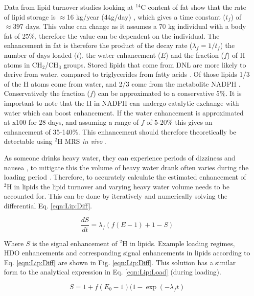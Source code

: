 Data from lipid turnover studies looking at $^{14}$C content of fat show that the rate of lipid storage is $\approx$16 kg/year (44g/day) \cite{Arner2011DynamicsDisease, Spalding2017ImpactTissue}, which gives a time constant ($t_f$) of $\approx$397 days. This value can change as it assumes a 70 kg individual with a body fat of 25\%, therefore the value can be dependent on the individual. The enhancement in fat is therefore the product of the decay rate ($\lambda_f = 1/t_f$) the number of days loaded ($t$), the water enhancement ($E$) and the fraction ($f$) of H atoms in CH$_2$/CH$_3$ groups. Stored lipids that come from \ac{DNL} are more likely to derive from water, compared to triglycerides from fatty acids \cite{Strawford2004AdiposeO}. Of those lipids 1/3 of the H atoms come from water, and 2/3 come from the metabolite NADPH \cite{Zhang2017ChemicalNADPH}. Conservatively the fraction ($f$) can be approximated to a conservative 5\%. It is important to note that the H in NADPH can undergo catalytic exchange with water which can boost enhancement. If the water enhancement is approximated at x100 for 28 days, and assuming a range of $f$ of 5-20\% this gives an enhancement of 35-140\%. This enhancement should therefore theoretically be detectable using $^2$H MRS \textit{in vivo} \cite{Brereton1986PreliminarySpectroscopy}. 

As someone drinks heavy water, they can experience periods of dizziness and nausea \cite{Money1974HeavyAlcohol}, to mitigate this the volume of heavy water drank often varies during the loading period \cite{Strawford2004AdiposeO, Cocking2023DeuteriumDosing}. Therefore, to accurately calculate the estimated enhancement of $^2$H in lipids the lipid turnover and varying heavy water volume needs to be accounted for. This can be done by iteratively and numerically solving the differential Eq. \ref{eqn:Lip:Diff}.

\begin{equation}
    \frac{dS}{dt} = \lambda_f(f(E-1)+1-S)
    \label{eqn:Lip:Diff}
\end{equation}

Where $S$ is the signal enhancement of $^2$H in lipids. Example loading regimes, \ac{HDO} enhancements and corresponding signal enhancements in lipids according to Eq. \ref{eqn:Lip:Diff} are shown in Fig. \ref{eqn:Lip:Diff}. This solution has a similar form to the analytical expression in Eq. \ref{eqn:Lip:Load} (during loading).

\begin{equation}
    S = 1 + f(E_0 - 1)(1 - \exp(-\lambda_ft)
    \label{eqn:Lip:Load}
\end{equation}

